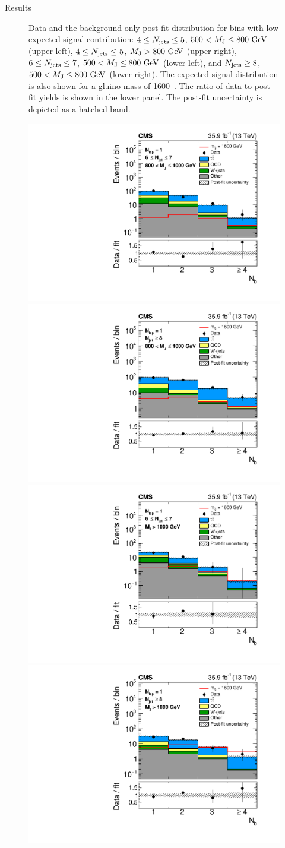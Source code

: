 \begin{section}{Results}
\begin{figure}[tbp!]
\caption{Data and the background-only post-fit \Nb distribution for bins with low expected signal contribution: $4 \leq N_{\mathrm{jets}} \leq 5$, $500 < M_\mathrm{J} \leq 800~\mathrm{Ge\kern -0.1em V}$ (upper-left), $4 \leq N_{\mathrm{jets}} \leq 5$, $M_\mathrm{J} > 800~\mathrm{Ge\kern -0.1em V}$ (upper-right), $6 \leq N_{\mathrm{jets}} \leq 7$, $500 < M_\mathrm{J} \leq 800~\mathrm{Ge\kern -0.1em V}$ (lower-left), and $N_{\mathrm{jets}} \geq 8$, $500 < M_\mathrm{J} \leq 800~\mathrm{Ge\kern -0.1em V}$ (lower-right).
The expected signal distribution is also shown for a gluino mass of 1600~\GeV.
The ratio of data to post-fit yields is shown in the lower panel.
The post-fit uncertainty is depicted as a hatched band.}
\label{fig:fit_bonly_cr}
\end{figure}

\begin{figure}[tbp!]
\centering
\includegraphics[angle=0,width=0.45\columnwidth]{fig/fit_nlep1_nj67_highmj.pdf}
\includegraphics[angle=0,width=0.45\columnwidth]{fig/fit_nlep1_nj8_highmj.pdf}
\includegraphics[angle=0,width=0.45\columnwidth]{fig/fit_nlep1_nj67_vhighmj.pdf}
\includegraphics[angle=0,width=0.45\columnwidth]{fig/fit_nlep1_nj8_vhighmj.pdf}

\end{figure}
\end{section}
